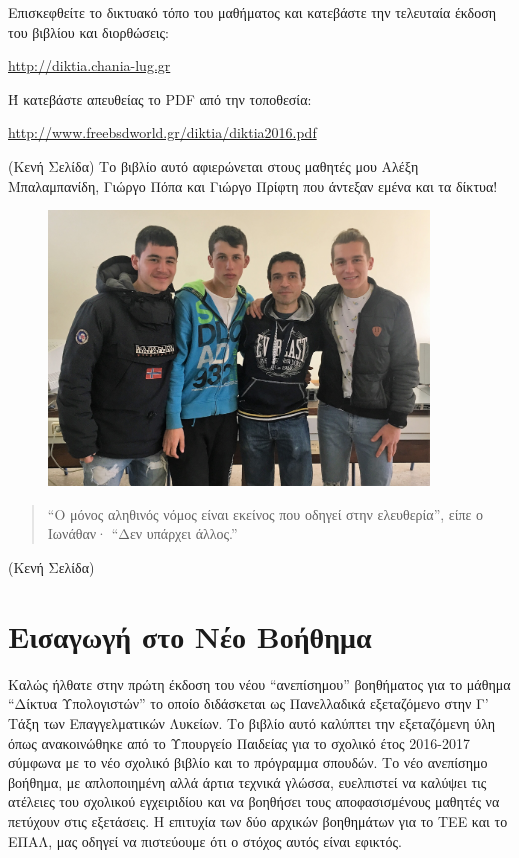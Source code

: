 \bigskip
Επισκεφθείτε το δικτυακό τόπο του μαθήματος
και κατεβάστε την τελευταία έκδοση του βιβλίου και διορθώσεις:

\bigskip
\begin{center}
\url{http://diktia.chania-lug.gr}
\end{center}
\bigskip
Ή κατεβάστε απευθείας το PDF από την τοποθεσία:
\bigskip
\begin{center}
\url{http://www.freebsdworld.gr/diktia/diktia2016.pdf}
\end{center}
\newpage
(Κενή Σελίδα)
\newpage
Το βιβλίο αυτό αφιερώνεται στους μαθητές μου Αλέξη Μπαλαμπανίδη, Γιώργο Πόπα και Γιώργο Πρίφτη που άντεξαν εμένα και τα δίκτυα!\\

\begin{figure}[!ht]
\includegraphics[width=0.9\textwidth]{images/intro/photo}
\end{figure}
\begin{quote}
``Ο μόνος αληθινός νόμος είναι εκείνος που οδηγεί στην ελευθερία'', είπε ο Ιωνάθαν· ``Δεν υπάρχει άλλος.''

\end{quote}
\newpage
(Κενή Σελίδα)
\newpage
\section*{Εισαγωγή στο Νέο Βοήθημα}
Καλώς ήλθατε στην πρώτη έκδοση του νέου ``ανεπίσημου'' βοηθήματος για το
μάθημα ``Δίκτυα Υπολογιστών'' το οποίο διδάσκεται ως
Πανελλαδικά εξεταζόμενο στην Γ' Τάξη των Επαγγελματικών Λυκείων.  Το βιβλίο
αυτό καλύπτει την εξεταζόμενη ύλη όπως ανακοινώθηκε από το Υπουργείο Παιδείας
για το σχολικό έτος 2016-2017 σύμφωνα με το νέο σχολικό βιβλίο και το πρόγραμμα
σπουδών.  Το νέο ανεπίσημο βοήθημα, με απλοποιημένη
αλλά άρτια τεχνικά γλώσσα, ευελπιστεί να καλύψει τις ατέλειες του σχολικού
εγχειριδίου και να βοηθήσει τους αποφασισμένους μαθητές να πετύχουν στις
εξετάσεις. Η επιτυχία των δύο αρχικών βοηθημάτων για το ΤΕΕ και το ΕΠΑΛ,
μας οδηγεί να πιστεύουμε ότι ο στόχος αυτός είναι εφικτός.

